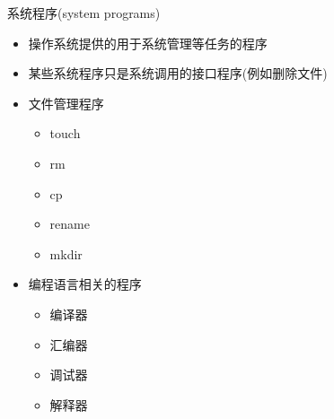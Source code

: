 \documentclass[xcolor=svgnames]{beamer}
\begin{document}
\begin{CJK*}{UTF8}{gbsn}
\begin{frame}{系统程序(system programs)}
\begin{itemize}
\item 操作系统提供的用于系统管理等任务的程序
\item 某些系统程序只是系统调用的接口程序(例如删除文件)
\item 文件管理程序
\begin{itemize}
\item touch
\item rm
\item cp
\item rename
\item mkdir
\end{itemize}
\item 编程语言相关的程序
\begin{itemize}
\item 编译器
\item 汇编器
\item 调试器
\item 解释器
\end{itemize}
\end{itemize}
\end{frame}

\end{CJK*}
\end{document}

